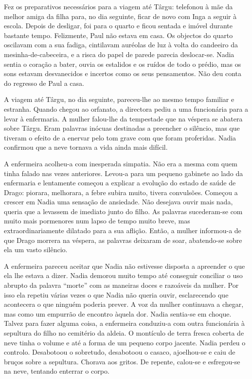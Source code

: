 Fez os preparativos necessários para a viagem até Târgu: telefonou à mãe
da melhor amiga da filha para, no dia seguinte, ficar de novo com Inga a
seguir à escola. Depois de desligar, foi para o quarto e ficou sentada e
imóvel durante bastante tempo. Felizmente, Paul não estava em casa. Os
objectos do quarto oscilavam com a sua fadiga, cintilavam auréolas de
luz à volta do candeeiro da mesinha-de-cabeceira, e a risca do papel de
parede parecia deslocar-se. Nadia sentia o coração a bater, ouvia os
estalidos e os ruídos de todo o prédio, mas os sons estavam desvanecidos
e incertos como os seus pensamentos. Não deu conta do regresso de Paul
a casa.

A viagem até Târgu, no dia seguinte, pareceu-lhe ao mesmo tempo familiar
e estranha. Quando chegou ao orfanato, a directora pediu a uma
funcionária para a levar à enfermaria. A mulher falou-lhe da tempestade
que na véspera se abatera sobre Târgu. Eram palavras inócuas destinadas
a preencher o silêncio, mas que tiveram o efeito de a enervar pelo tom
grave com que foram proferidas. Nadia confirmou que a neve tornava a
vida ainda mais difícil.

A enfermeira acolheu-a com inesperada simpatia. Não era a mesma com quem
tinha falado nas vezes anteriores. Levou-a para um pequeno gabinete ao
lado da enfermaria e lentamente começou a explicar a evolução do estado
de saúde de Drago: piorara, melhorara, a febre subira muito, tivera
convulsões. Começou a crescer em Nadia uma sensação de ansiedade. Não
desejava ouvir mais nada, queria
que a levassem de imediato junto do filho. As palavras sucederam-se com
muito mais pormenores num lapso de tempo muito breve, mas
extraordinariamente dilatado para a sua aflição. Então, a mulher
informou-a de que Drago morrera na véspera, as palavras deixaram de
soar, abatendo-se sobre ela um vasto silêncio.

A enfermeira pareceu aceitar que Nadia não estivesse disposta a
apreender o que ela lhe estava a dizer. Nadia demorou muito tempo até
conseguir conciliar o uso abrupto da palavra ``morte'' com as maneiras
doces e razoáveis da mulher. Por isso ela repetiu várias vezes o que
Nadia não queria ouvir, esclarecendo que acontecera o que ninguém
poderia prever. A voz da mulher continuava a chegar, mas como um
empurrão de encontro àquela dor. Nadia sentia-se em choque. Talvez para
fazer alguma coisa, a enfermeira conduziu-a com outra funcionária à
sepultura do filho no cemitério da aldeia. O montículo de terra fresca
coberta de neve tinha o volume e até a forma de um pequeno corpo
jacente. Nadia perdeu o controlo. Desabotoou o sobretudo, desabotoou o
casaco, ajoelhou-se e caiu de bruços sobre a sepultura. Chorava aos
gritos. De repente, calou-se e esfregou-se na neve, tentando enterrar o
corpo.


